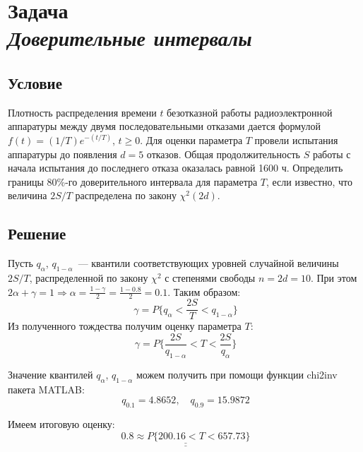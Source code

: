 \section*{Задача \\\textit{Доверительные интервалы}}

\subsection*{Условие}
\sloppy Плотность распределения времени $t$ безотказной работы радиоэлектронной аппаратуры между двумя последовательными отказами дается формулой $f(t) = (1/T)e^{-(t/T)}$, $t \geqslant 0$. Для оценки параметра $T$ провели испытания аппаратуры до появления $d = 5$ отказов. Общая продолжительность $S$ работы с начала испытания до последнего отказа оказалась равной 1600 ч. Определить границы 80\%-го доверительного интервала для параметра $T$, если известно, что величина $2S/T$ распределена по закону $\chi^2(2d)$.

\subsection*{Решение}
Пусть $q_{\alpha}$, $q_{1 - \alpha}$~--- квантили соответствующих уровней случайной величины $2S/T$, распределенной по закону $\chi^2$ с степенями свободы $n = 2d = 10$. При этом $2\alpha + \gamma = 1 \Rightarrow \alpha = \frac{1 - \gamma}{2} = \frac{1 - 0.8}{2} = 0.1$. Таким образом:
\begin{equation*}
    \gamma = P\Big\{q_{\alpha} < \frac{2S}{T} < q_{1 - \alpha}\Big\}
\end{equation*}
Из полученного тождества получим оценку параметра $T$:
\begin{equation*}
    \gamma = P\Big\{\frac{2S}{q_{1 - \alpha}} < T < \frac{2S}{q_{\alpha}}\Big\}
\end{equation*}

Значение квантилей $q_{\alpha}$, $q_{1 - \alpha}$ можем получить при помощи функции chi2inv пакета MATLAB\@:
\begin{equation*}
    q_{0.1} = 4.8652,\quad q_{0.9} = 15.9872
\end{equation*}

Имеем итоговую оценку:
\begin{equation*}
    \underline{\underline{0.8 \approx P\Big\{200.16 < T < 657.73\Big\}}}
\end{equation*}

